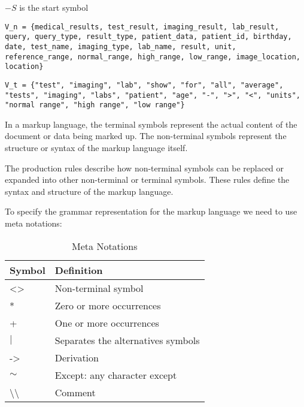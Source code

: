\( -S\) is the start symbol

\begin{lstlisting}
V_n = {medical_results, test_result, imaging_result, lab_result, query, query_type, result_type, patient_data, patient_id, birthday, date, test_name, imaging_type, lab_name, result, unit, reference_range, normal_range, high_range, low_range, image_location, location}
\end{lstlisting}

\begin{lstlisting}
V_t = {"test", "imaging", "lab", "show", "for", "all", "average", "tests", "imaging", "labs", "patient", "age", "-", ">", "<", "units", "normal range", "high range", "low range"}
\end{lstlisting}

In a markup language, the terminal symbols represent the actual content of the document or data being marked up. The non-terminal symbols represent the structure or syntax of the markup language itself. \par
The production rules describe how non-terminal symbols can be replaced or expanded into other non-terminal or terminal symbols. These rules define the syntax and structure of the markup language. \par
To specify the grammar representation for the markup language we need to use meta notations:

\begin{table}[H]
\caption{\label{demo-table}Meta Notations}
\centering
\begin{tabular}{|l|l|}
\hline
Symbol                           & Definition                         \\ \hline
\textless{}\textgreater{}        & Non-terminal symbol                \\ \hline
*                                & Zero or more occurrences           \\ \hline
+                                & One or more occurrences            \\ \hline
$\mid$                           & Separates the alternatives symbols \\ \hline
-\textgreater{}                  & Derivation                         \\ \hline
$\sim$                           & Except: any character except       \\ \hline
\textbackslash{}\textbackslash{} & Comment                            \\ \hline
\end{tabular}
\end{table}

